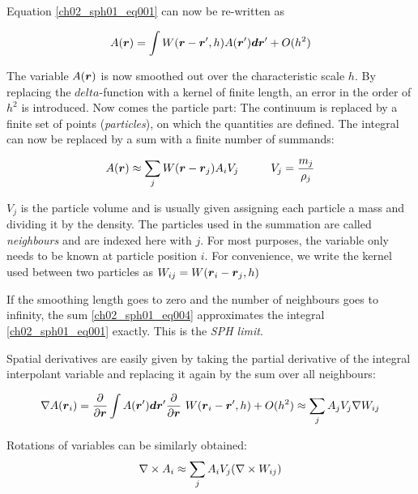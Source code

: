 Equation \ref{ch02_sph01_eq001} can now be re-written as 

\begin{equation}
\label{ch02_sph01_eq003}
A(\boldsymbol{r}) = \int  W(\boldsymbol{r} - \boldsymbol{r}', h) A(\boldsymbol{r}') \boldsymbol{d} \boldsymbol{r}' + O(h^2)
\end{equation}

The variable $A(\boldsymbol{r})$ is now smoothed out over the characteristic scale $h$. By replacing the $delta$-function with a kernel of finite length, an error in the order of $h^2$ is introduced. Now comes the particle part: The continuum is replaced by a finite set of points (\emph{particles}), on which the quantities are defined. The integral can now be replaced by a sum with a finite number of summands:

\begin{equation}
\label{ch02_sph01_eq004}
A(\boldsymbol{r}) \approx \sum_{j} W(\boldsymbol{r} - \boldsymbol{r}_{j}) A_i V_{j} \hspace{1.0cm} V_{j} = \frac{m_j}{\rho_j}
\end{equation}

$V_{j}$ is the particle volume and is usually given assigning each particle a mass and dividing it by the density. The particles used in the summation are called \emph{neighbours} and are indexed here with $j$. For most purposes, the variable only needs to be known at particle position $i$. For convenience, we write the kernel used between two particles as $W_{ij} = W( \boldsymbol{r}_{i} - \boldsymbol{r}_{j}, h)$

If the smoothing length goes to zero and the number of neighbours goes to infinity, the sum \ref{ch02_sph01_eq004} approximates the integral \ref{ch02_sph01_eq001} exactly. This is the \emph{SPH limit}.

Spatial derivatives are easily given by taking the partial derivative of the integral interpolant variable and replacing it again by the sum over all neighbours:

\begin{equation}
\label{ch02_sph01_eq005}
\nabla A(\boldsymbol{r}_i) = \frac{\partial}{\partial \boldsymbol{r}}\int A(\boldsymbol{r}') \boldsymbol{d} \boldsymbol{r}' \frac{\partial}{\partial \boldsymbol{r}}\ W(\boldsymbol{r}_i - \boldsymbol{r}', h) + O(h^2)
\approx \sum_{j} A_j V_{j} \nabla W_{ij} 
\end{equation}

Rotations of variables can be similarly obtained:
\begin{equation}
\label{ch02_sph01_eq006}
\nabla \times A_i \approx \sum_{j} A_i V_{j} (\nabla \times W_{ij})
\end{equation}

